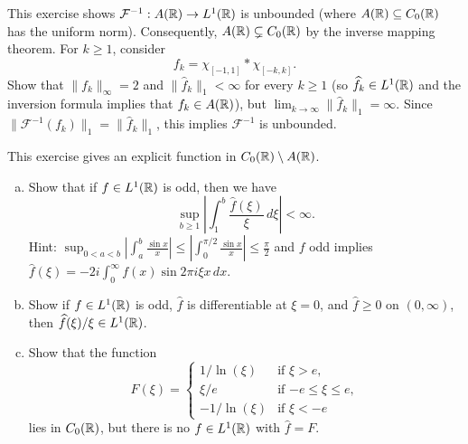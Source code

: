 \begin{exercise}
  This exercise shows
  $\mathcal{F}^{-1} : A(\mathbb{R}) \to L^1(\mathbb{R})$
  is unbounded (where $A(\mathbb{R}) \subseteq C_0(\mathbb{R})$ has
  the uniform norm). Consequently,
  $A(\mathbb{R}) \subsetneq C_0(\mathbb{R})$ by the inverse
  mapping theorem. For $k \ge 1$, consider
  \[
    f_k = \chi_{[-1, 1]} * \chi_{[-k, k]}.
  \]
  Show that
  $\|f_k\|_\infty = 2$ and
  $\|\widehat{f}_k\|_1 < \infty$ for every $k \ge 1$
  (so $\widehat{f}_k \in L^1(\mathbb{R})$ and the inversion
  formula implies that $f_k \in A(\mathbb{R})$),
  but $\lim_{k \to \infty} \|\widehat{f}_k\|_1 = \infty$.
  Since $\|\mathcal{F}^{-1}(f_k)\|_1 = \|\widehat{f}_k\|_1$,
  this implies $\mathcal{F}^{-1}$ is unbounded.
\end{exercise}

\begin{exercise}
  This exercise gives an explicit
  function in $C_0(\mathbb{R}) \setminus A(\mathbb{R})$.
  \begin{enumerate}[(a)]
    \item Show that if
      $f \in L^1(\mathbb{R})$ is odd, then we have
      \[
        \sup_{b \ge 1} \left|\int_1^b \frac{\widehat{f}(\xi)}{\xi}\, d\xi\right| < \infty.
      \]
      Hint: $\displaystyle \sup_{0 < a < b} \left|\int_a^b \frac{\sin x}{x}\right| \le \left|\int_0^{\pi / 2} \frac{\sin x}{x}\right| \le \frac{\pi}{2}$
      and $f$ odd implies
      $\displaystyle \widehat{f}(\xi) = -2i \int_0^\infty f(x) \sin 2\pi i \xi x\, dx$.
    \item Show if $f \in L^1(\mathbb{R})$ is odd,
      $\widehat{f}$ is differentiable at $\xi = 0$,
      and $\widehat{f} \ge 0$ on $(0, \infty)$, then
      $\widehat{f}(\xi) / \xi \in L^1(\mathbb{R})$.
    \item Show that the function
      \[
        F(\xi) =
        \begin{cases}
          1 /{\ln(\xi)} & \text{if $\xi > e$}, \\
          \xi / e & \text{if $-e \le \xi \le e$}, \\
          -1 / {\ln (\xi)} & \text{if $\xi < -e$}
        \end{cases}
      \]
      lies in $C_0(\mathbb{R})$, but there is
      no $f \in L^1(\mathbb{R})$ with $\widehat{f} = F$.
  \end{enumerate}
\end{exercise}
